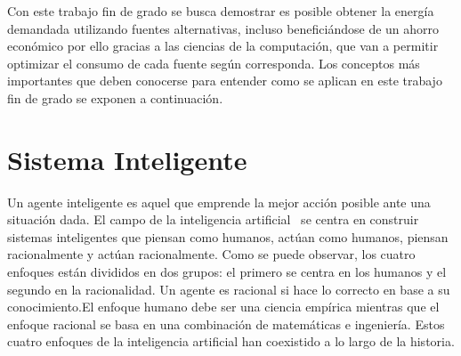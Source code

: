 Con este trabajo fin de grado se busca demostrar es posible obtener la energía demandada utilizando fuentes alternativas, incluso beneficiándose de un ahorro económico por ello gracias a las ciencias de la computación, que van a permitir optimizar el consumo de cada fuente según corresponda. Los conceptos más importantes que deben conocerse para entender como se aplican en este trabajo fin de grado se exponen a continuación.

\section{Sistema Inteligente}
Un agente inteligente es aquel que emprende la mejor acción posible ante una situación dada. El campo de la inteligencia artificial~\cite{Russ06} se centra en construir sistemas inteligentes que piensan como humanos, actúan como humanos, piensan racionalmente y actúan racionalmente. Como se puede observar, los cuatro enfoques están divididos en dos grupos: el primero se centra en los humanos y el segundo en la racionalidad. Un agente es racional si hace lo correcto en base a su conocimiento.El enfoque humano debe ser una ciencia empírica mientras que el enfoque racional se basa en una combinación de matemáticas e ingeniería. Estos cuatro enfoques de la inteligencia artificial han coexistido a lo largo de la historia.\\
